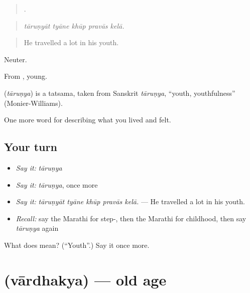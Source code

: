 \begin{quote}
    .
\end{quote}

\begin{quote}
\emph{tāruṇyāt tyāne khūp pravās kelā.}
\end{quote}

\begin{quote}
He travelled a lot in his youth.
\end{quote}

Neuter.

From , young.

\begin{cousinweb}
\textbf{} (\emph{tāruṇya}) is a tatsama, taken from Sanskrit \emph{tāruṇya}, \textquotedblleft{}youth, youthfulness\textquotedblright{} (Monier-Williams).
\end{cousinweb}

\begin{grammarlens}[title={What you've built}]
One more word for describing what you lived and felt.
\end{grammarlens}

\subsection*{Your turn}
\begin{itemize}
\raggedright
  \item \emph{Say it:} \emph{tāruṇya}
  \item \emph{Say it:} \emph{tāruṇya}, once more
  \item \emph{Say it:} \emph{tāruṇyāt tyāne khūp pravās kelā.} — He travelled a lot in his youth.
  \item \emph{Recall:} say the Marathi for step-, then the Marathi for childhood, then say \emph{tāruṇya} again
\end{itemize}

\begin{tcolorbox}[breakable,colback=teal!4,colframe=teal!35!black,title={Before you move on}]
What does  mean? (\textquotedblleft{}Youth\textquotedblright{}.) Say it once more.
\end{tcolorbox}
\section[\texorpdfstring{\mr{वार्धक्य} (vārdhakya)}{वार्धक्य (vārdhakya)}]{ (vārdhakya) — old age}

